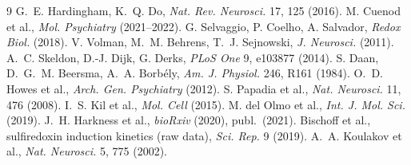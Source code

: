 \documentclass[11pt,a4paper]{article}
\theoremstyle{remark}
\begin{document}
\smallskip
\begin{thebibliography}{9}\small
\itemsep0pt
 G.~E. Hardingham, K.~Q. Do, \emph{Nat. Rev. Neurosci.} 17, 125 (2016).
 M. Cuenod et al., \emph{Mol. Psychiatry} (2021--2022).
 G. Selvaggio, P. Coelho, A. Salvador, \emph{Redox Biol.} (2018).
 V. Volman, M.~M. Behrens, T.~J. Sejnowski, \emph{J. Neurosci.} (2011).
 A.~C. Skeldon, D.-J. Dijk, G. Derks, \emph{PLoS One} 9, e103877 (2014).
 S. Daan, D.~G.~M. Beersma, A.~A. Borb\'ely, \emph{Am. J. Physiol.} 246, R161 (1984).
 O.~D. Howes et al., \emph{Arch. Gen. Psychiatry} (2012).
 S. Papadia et al., \emph{Nat. Neurosci.} 11, 476 (2008).
 I.~S. Kil et al., \emph{Mol. Cell} (2015).
 M. del Olmo et al., \emph{Int. J. Mol. Sci.} (2019).
 J.~H. Harkness et al., \emph{bioRxiv} (2020), publ.\ (2021).
 Bischoff et al., sulfiredoxin induction kinetics (raw data), \emph{Sci. Rep.} 9 (2019).
 A.~A. Koulakov et al., \emph{Nat. Neurosci.} 5, 775 (2002).
\end{thebibliography}
\end{document}
